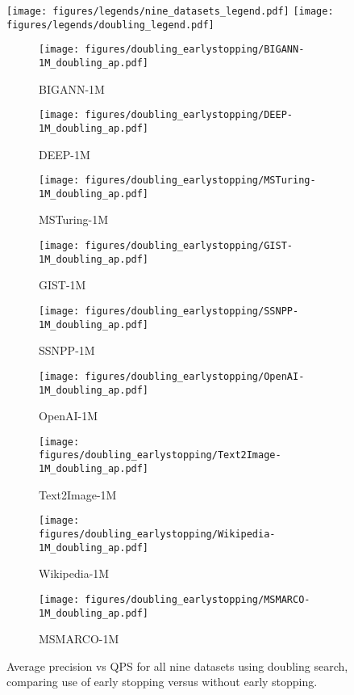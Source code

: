 \begin{figure*}
	\centering
	\texttt{[image: figures/legends/nine\_datasets\_legend.pdf]}
	\texttt{[image: figures/legends/doubling\_legend.pdf]} \\
	\begin{subfigure}{.33\textwidth}
		\texttt{[image: figures/doubling\_earlystopping/BIGANN-1M\_doubling\_ap.pdf]}
		\caption{BIGANN-1M}\label{fig:bigannap_doubling}
	\end{subfigure} 
	\begin{subfigure}{.33\textwidth}
		\texttt{[image: figures/doubling\_earlystopping/DEEP-1M\_doubling\_ap.pdf]}
		\caption{DEEP-1M}\label{fig:deepap_doubling}
	\end{subfigure}
	\begin{subfigure}{.33\textwidth}
		\texttt{[image: figures/doubling\_earlystopping/MSTuring-1M\_doubling\_ap.pdf]}
		\caption{MSTuring-1M}\label{fig:msturingap_doubling}
	\end{subfigure}\hfil
	\begin{subfigure}{.3\textwidth}
		\texttt{[image: figures/doubling\_earlystopping/GIST-1M\_doubling\_ap.pdf]}
		\caption{GIST-1M}\label{fig:gistap_doubling}
	\end{subfigure} 
	\begin{subfigure}{.33\textwidth}
		\texttt{[image: figures/doubling\_earlystopping/SSNPP-1M\_doubling\_ap.pdf]}
		\caption{SSNPP-1M}\label{fig:ssnppap_doubling}
	\end{subfigure}
	\begin{subfigure}{.33\textwidth}
		\texttt{[image: figures/doubling\_earlystopping/OpenAI-1M\_doubling\_ap.pdf]}
		\caption{OpenAI-1M}\label{fig:openaiap_doubling}
	\end{subfigure}\hfil
	\begin{subfigure}{.33\textwidth}
		\texttt{[image: figures/doubling\_earlystopping/Text2Image-1M\_doubling\_ap.pdf]}
		\caption{Text2Image-1M}\label{fig:t2iap_doubling}
	\end{subfigure} 
	\begin{subfigure}{.33\textwidth}
		\texttt{[image: figures/doubling\_earlystopping/Wikipedia-1M\_doubling\_ap.pdf]}
		\caption{Wikipedia-1M}\label{fig:wikiap_doubling}
	\end{subfigure}
	\begin{subfigure}{.33\textwidth}
		\texttt{[image: figures/doubling\_earlystopping/MSMARCO-1M\_doubling\_ap.pdf]}
		\caption{MSMARCO-1M}\label{fig:msmarcoap_doubling}
	\end{subfigure}
	\caption{Average precision vs QPS for all nine datasets using doubling search, comparing use of early stopping versus without early stopping.}
	\label{fig:ppgraphearlystoppingdoubling}
\end{figure*}


